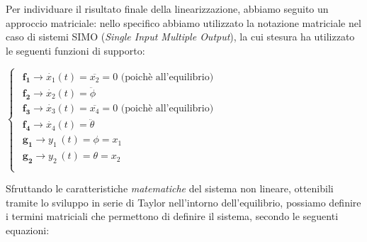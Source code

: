Per individuare il risultato finale della linearizzazione, abbiamo seguito un approccio matriciale: nello specifico abbiamo utilizzato la notazione matriciale nel caso di sistemi SIMO (\textit{Single Input Multiple Output}), la cui stesura ha utilizzato le seguenti funzioni di supporto:

\begin{center}
	$
	\begin{cases}
		\begin{array}{c}
			\mathbf{f_1} \to {\dot{x_1} \left(t\right)} =\overline{x_2 } =0\text{ (poichè all'equilibrio)}\\
			\mathbf{f_2} \to {\dot{x_2} \left(t\right)} = {\ddot{\phi} \;}\\
			\mathbf{f_3} \to {\dot{x_3} \left(t\right)} =\overline{x_4 } =0\text{ (poichè all'equilibrio)}\\
			\mathbf{f_4} \to {\dot{x_4} \left(t\right)=} {\ddot{\theta} \;}\\
			\mathbf{g_1} \to y_{1\;} \left(t\right)=\phi = x_{1\;}\\
			\mathbf{g_2} \to y_{2\;} \left(t\right)=\theta =x_{2\;}\\
		\end{array}
	\end{cases}
	$
\end{center}

Sfruttando le caratteristiche \textit{matematiche} del sistema non lineare, ottenibili tramite lo sviluppo in serie di Taylor nell'intorno dell'equilibrio, possiamo definire i termini matriciali che permettono di definire il sistema, secondo le seguenti equazioni:

